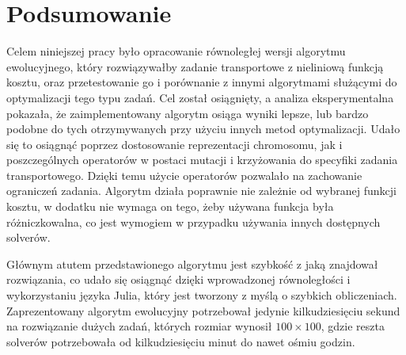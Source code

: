 \chapter{Podsumowanie}
\thispagestyle{chapterBeginStyle}

Celem niniejszej pracy było opracowanie równoległej wersji algorytmu ewolucyjnego, który rozwiązywałby zadanie transportowe z nieliniową funkcją 
kosztu, oraz przetestowanie go i porównanie z innymi algorytmami służącymi do optymalizacji tego typu zadań. Cel został osiągnięty, a analiza 
eksperymentalna pokazała, że zaimplementowany algorytm osiąga wyniki lepsze, lub bardzo podobne do tych otrzymywanych przy użyciu innych 
metod optymalizacji. Udało się to osiągnąć poprzez dostosowanie reprezentacji chromosomu, jak i poszczególnych operatorów w postaci mutacji 
i krzyżowania do specyfiki zadania transportowego. Dzięki temu użycie operatorów pozwalało na zachowanie ograniczeń zadania. Algorytm działa 
poprawnie nie zależnie od wybranej funkcji kosztu, w dodatku nie wymaga on tego, żeby używana funkcja była różniczkowalna, co jest wymogiem 
w przypadku używania innych dostępnych solverów.

Głównym atutem przedstawionego algorytmu jest szybkość z jaką znajdował rozwiązania, co udało 
się osiągnąć dzięki wprowadzonej równoległości i wykorzystaniu języka Julia, który jest tworzony z myślą o szybkich obliczeniach. Zaprezentowany 
algorytm ewolucyjny potrzebował jedynie kilkudziesięciu sekund na rozwiązanie dużych zadań, których rozmiar wynosił $100 \times 100$, gdzie reszta 
solverów potrzebowała od kilkudziesięciu minut do nawet ośmiu godzin.





